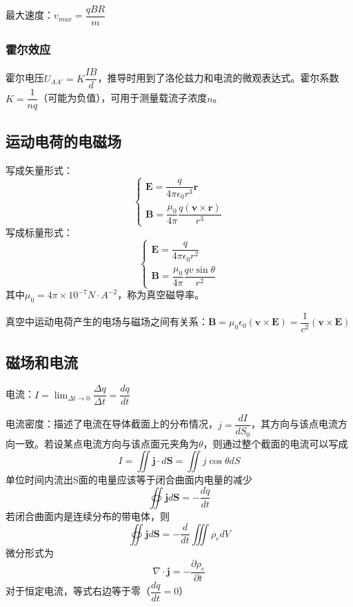 最大速度：$v_{max}=\dfrac{qBR}{m}$
\subsubsection{霍尔效应}
霍尔电压$U_{AA'}=K\dfrac{IB}{d}$，推导时用到了洛伦兹力和电流的微观表达式。霍尔系数$K=\dfrac{1}{nq}$（可能为负值），可用于测量载流子浓度$n$。
\subsection{运动电荷的电磁场}
写成矢量形式：
\begin{equation}
    \begin{cases}
        \bm{E}=\dfrac{q}{4\pi \epsilon_0 r^3}\bm{r}\\
        \bm{B}=\dfrac{\mu_0}{4\pi}\dfrac{q(\bm{v}\times \bm{r})}{r^3}
    \end{cases}
\end{equation}
写成标量形式：
\begin{equation}
    \begin{cases}
        \bm{E}=\dfrac{q}{4\pi \epsilon_0 r^2}\\
        \bm{B}=\dfrac{\mu_0}{4\pi}\dfrac{qv\sin \theta}{r^2}
    \end{cases}
\end{equation}
其中$\mu_0=4\pi \times 10^{-7}N\cdot A^{-2}$，称为真空磁导率。

真空中运动电荷产生的电场与磁场之间有关系：$\bm{B}=\mu_0\epsilon_0(\bm{v}\times \bm{E})=\dfrac{1}{c^2}(\bm{v}\times \bm{E})$
\subsection{磁场和电流}
电流：$I=\lim_{\Delta t\to 0}\dfrac{\Delta q}{\Delta t}=\dfrac{dq}{dt}$

电流密度：描述了电流在导体截面上的分布情况，$j=\dfrac{dI}{dS_0}$，其方向与该点电流方向一致。若设某点电流方向与该点面元夹角为$\theta$，则通过整个截面的电流可以写成
\begin{equation}
    I=\iint \bm{j}\cdot d\bm{S}=\iint j\cos \theta dS
\end{equation}
单位时间内流出S面的电量应该等于闭合曲面内电量的减少
\begin{equation}
    \oiint \bm{j}d\bm{S}=-\dfrac{dq}{dt}
\end{equation}
若闭合曲面内是连续分布的带电体，则
\begin{equation}
    \oiint \bm{j}d\bm{S}=-\dfrac{d}{dt}\iiint \rho_edV
\end{equation}
微分形式为
\begin{equation}
    \nabla\cdot \bm{j}=-\dfrac{\partial \rho_e}{\partial t}
\end{equation}
对于恒定电流，等式右边等于零（$\dfrac{dq}{dt}=0$）

